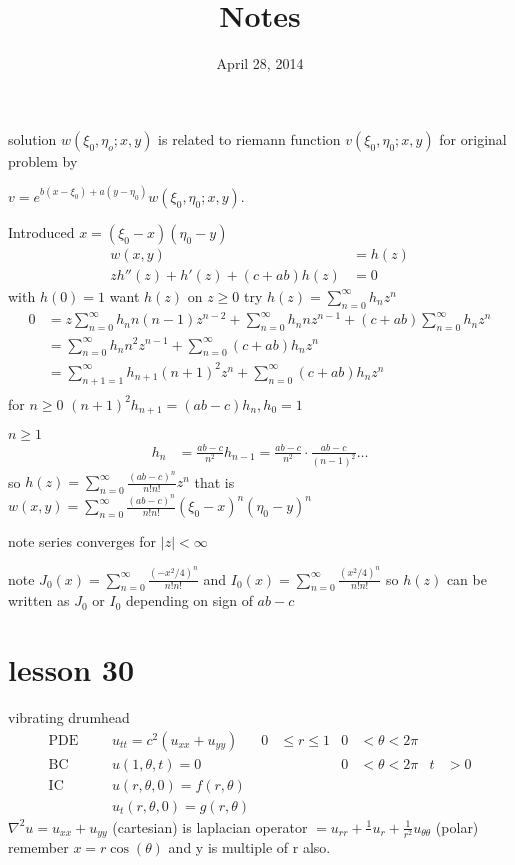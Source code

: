 \documentclass{article}
\newcommand{\abs}[1]{\left\lvert #1 \right\rvert}
\begin{document}
\title{Notes}
\date{April 28, 2014}
\maketitle
solution $w(\xi_0,\eta_o;x,y)$ is related to riemann function $v(\xi_0,\eta_0;x,y)$ for original problem by

$v=e^{b(x-\xi_0)+a(y-\eta_0)}w(\xi_0,\eta_0;x,y)$. 

Introduced $x=(\xi_0-x)(\eta_0-y)$
\begin{align*}
  w(x,y)&=h(z)\\
  zh''(z)+h'(z)+(c+ab)h(z)&=0
\end{align*}
with $h(0)=1$ want $h(z)$ on $z\ge0$
try $h(z)=\sum\limits_{n=0}^\infty{h_nz^n}$
\begin{align*}
  0&=z\sum\limits_{n=0}^\infty{h_nn(n-1)z^{n-2}}+\sum\limits_{n=0}^\infty{h_nnz^{n-1}}+(c+ab)\sum\limits_{n=0}^\infty{h_nz^{n}}\\
  &=\sum\limits_{n=0}^\infty{h_nn^2z^{n-1}}+\sum\limits_{n=0}^\infty{(c+ab)h_nz^{n}}\\
  &=\sum\limits_{n+1=1}^\infty{h_{n+1}(n+1)^2z^n}+\sum\limits_{n=0}^\infty{(c+ab)h_nz^{n}}\\
\end{align*}
for $n\ge0$ $(n+1)^2h_{n+1}=(ab-c)h_{n}, h_0=1$

$n\ge1$
\begin{align*}
  h_n&=\frac{ab-c}{n^2}h_{n-1}=\frac{ab-c}{n^2}\cdot\frac{ab-c}{(n-1)^2}\dots
\end{align*}
so $h(z)=\sum\limits_{n=0}^\infty{\frac{(ab-c)^n}{n!n!}z^n}$ that is $w(x,y)=\sum\limits_{n=0}^\infty{\frac{(ab-c)^n}{n!n!}(\xi_0-x)^n(\eta_0-y)^n}$

note series converges for $\abs{z}<\infty$

note $J_0(x)=\sum\limits_{n=0}^\infty{\frac{(-x^2/4)^n}{n!n!}}$ and $I_0(x)=\sum\limits_{n=0}^\infty{\frac{(x^2/4)^n}{n!n!}}$ so $h(z)$ can be written as $J_0$ or $I_0$ depending on sign of $ab-c$

\section*{lesson 30}
vibrating drumhead
\begin{align*}
  \text{PDE}&&&u_{tt}=c^2(u_{xx}+u_{yy})&0&\le r\le1&0&<\theta<2\pi\\
  \text{BC}&&&u(1,\theta,t)=0&&&0&<\theta<2\pi&t&>0\\
  \text{IC}&&&u(r,\theta,0)=f(r,\theta)\\
  &&&u_{t}(r,\theta,0)=g(r,\theta)
\end{align*}
$\nabla^2u=u_{xx}+u_{yy}$ (cartesian) is laplacian operator $=u_{rr}+\frac{1}{}u_{r}+\frac{1}{r^2}u_{\theta\theta}$ (polar) remember $x=r\cos(\theta)$ and y is multiple of r also.
\end{document}
